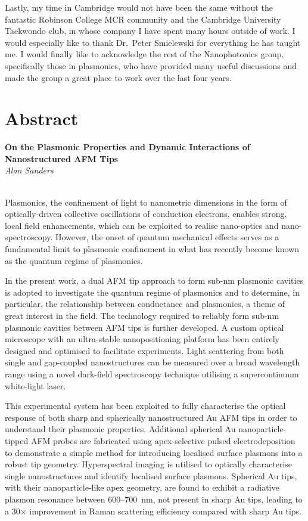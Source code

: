 \documentclass[12pt, a4paper, oneside]{book}
\begin{document}
Lastly, my time in Cambridge would not have been the same without the fantastic Robinson College MCR community and the Cambridge University Taekwondo club, in whose company I have spent many hours outside of work. I would especially like to thank Dr.\ Peter Smielewski for everything he has taught me. I would finally like to acknowledge the rest of the Nanophotonics group, specifically those in plasmonics, who have provided many useful discussions and made the group a great place to work over the last four years.

\newpage 
\section*{Abstract}

\begin{raggedright}
{\bfseries\large On the Plasmonic Properties and Dynamic Interactions of Nanostructured AFM Tips}\\[4pt]
{\emph{Alan Sanders}}
\end{raggedright}\\

\noindent
Plasmonics, the confinement of light to nanometric dimensions in the form of optically-driven collective oscillations of conduction electrons, enables strong, local field enhancements, which can be exploited to realise nano-optics and nano-spectroscopy. However, the onset of quantum mechanical effects serves as a fundamental limit to plasmonic confinement in what has recently become known as the quantum regime of plasmonics.

In the present work, a dual AFM tip approach to form sub-nm plasmonic cavities is adopted to investigate the quantum regime of plasmonics and to determine, in particular, the relationship between conductance and plasmonics, a theme of great interest in the field. The technology required to reliably form sub-nm plasmonic cavities between AFM tips is further developed. A custom optical microscope with an ultra-stable nanopositioning platform has been entirely designed and optimised to facilitate experiments. Light scattering from both single and gap-coupled nanostructures can be measured over a broad wavelength range using a novel dark-field spectroscopy technique utilising a supercontinuum white-light laser.

This experimental system has been exploited to fully characterise the optical response of both sharp and spherically nanostructured Au AFM tips in order to understand their plasmonic properties. Additional spherical Au nanoparticle-tipped AFM probes are fabricated using apex-selective pulsed electrodeposition to demonstrate a simple method for introducing localised surface plasmons into a robust tip geometry. Hyperspectral imaging is utilised to optically characterise single nanostructures and identify localised surface plasmons. Spherical Au tips, with their nanoparticle-like apex geometry, are found to exhibit a radiative plasmon resonance between 600--\SI{700}{nm}, not present in sharp Au tips, leading to a 30$\times$ improvement in Raman scattering efficiency compared with sharp Au tips.
\end{document}
